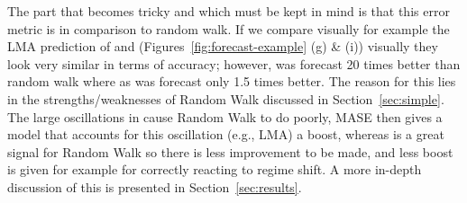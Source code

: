 The part that becomes tricky and which must be kept in mind is that this error metric is in comparison to random walk. If we compare visually for example the LMA prediction of \col and \svdfive (Figures~\ref{fig:forecast-example} (g) \& (i)) visually they look very similar in terms of accuracy; however, \col was forecast 20 times better than random walk where as \svdfive was forecast only 1.5 times better. The reason for this lies in the strengths/weaknesses of Random Walk discussed in Section~\ref{sec:simple}. The large oscillations in \col cause Random Walk to do poorly, MASE then gives a model that accounts for this oscillation (e.g., LMA) a boost, whereas \svdfive is a great signal for Random Walk so there is less improvement to be made, and less boost is given for example for correctly reacting to regime shift. A more in-depth discussion of this is presented in Section~\ref{sec:results}. 




